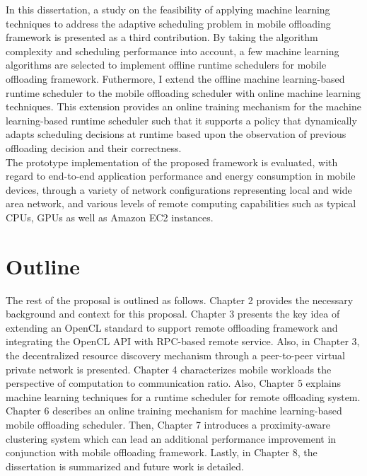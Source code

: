 %
In this dissertation, a study on the feasibility of applying machine
learning techniques to address the adaptive scheduling problem in mobile
offloading framework is presented as a third contribution.
%
By taking the algorithm complexity and scheduling performance into
account, a few machine learning algorithms are selected to implement
offline runtime schedulers for mobile offloading framework.
%
Futhermore, I extend the offline machine learning-based runtime
scheduler to the mobile offloading scheduler with online machine
learning techniques.
%
This extension provides an online training mechanism for the machine
learning-based runtime scheduler such that it supports a policy that
dynamically adapts scheduling decisions at runtime based upon the
observation of previous offloading decision and their correctness.\\
%
The prototype implementation of the proposed framework is evaluated,
with regard to end-to-end application performance and energy consumption
in mobile devices, through a variety of network configurations
representing local and wide area network, and various levels of remote
computing capabilities such as typical CPUs, GPUs as well as Amazon EC2
instances.
%
\section{Outline}
\label{intro:outline}
The rest of the proposal is outlined as follows.
%
Chapter 2 provides the necessary background and context for this
proposal.
%
Chapter 3 presents the key idea of extending an OpenCL standard to
support remote offloading framework and integrating the OpenCL API with
RPC-based remote service.
%
Also, in Chapter 3, the decentralized resource discovery mechanism
through a peer-to-peer virtual private network is presented.
%
Chapter 4 characterizes mobile workloads the perspective of computation
to communication ratio.
%
Also, Chapter 5 explains machine learning techniques for a runtime
scheduler for remote offloading system.
%
Chapter 6 describes an online training mechanism for machine
learning-based mobile offloading scheduler.
%
Then, Chapter 7 introduces a proximity-aware clustering system which can
lead an additional performance improvement in conjunction with mobile
offloading framework.
%
Lastly, in Chapter 8, the dissertation is summarized and future work
is detailed.
%
